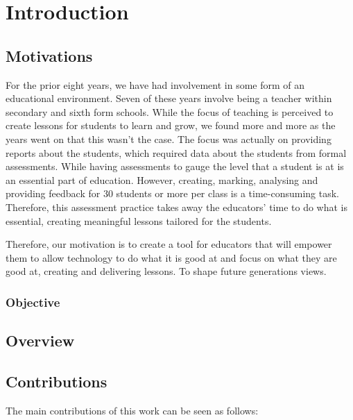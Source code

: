 \chapter{Introduction}
	\label{chap:intro}



	\section{Motivations}
		\label{sec:intro_motivation} 
	For the prior eight years, we have had involvement in some form of an educational environment. Seven of these years involve being a teacher within secondary and sixth form schools. While the focus of teaching is perceived to create lessons for students to learn and grow, we found more and more as the years went on that this wasn't the case. The focus was actually on providing reports about the students, which required data about the students from formal assessments. While having assessments to gauge the level that a student is at is an essential part of education. However, creating, marking, analysing and providing feedback for 30 students or more per class is a time-consuming task. Therefore, this assessment practice takes away the educators' time to do what is essential, creating meaningful lessons tailored for the students.
	
	Therefore, our motivation is to create a tool for educators that will empower them to allow technology to do what it is good at and focus on what they are good at, creating and delivering lessons. To shape future generations views.


	\subsection{Objective}
		\label{sec:intro_objective} 



	\section{Overview}  
		\label{sec:intro_overview} 



	\section{Contributions} 
		\label{sec:intro_contribs} 

The main contributions of this work can be seen as follows:

